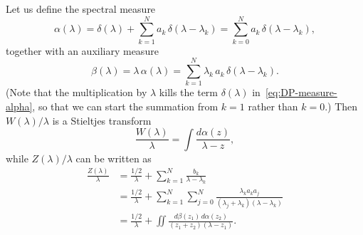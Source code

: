 \documentclass[10pt,a4paper]{article} \pdfoutput=1 
\begin{document}
Let us define the spectral measure
\begin{equation}
  \label{eq:DP-measure-alpha}
  \alpha(\lambda)
  = \delta(\lambda) + \sum_{k=1}^N a_k \, \delta(\lambda-\lambda_k)
  = \sum_{k=0}^N a_k \, \delta(\lambda-\lambda_k)
  ,
\end{equation}
together with an auxiliary measure
\begin{equation}
  \label{eq:DP-measure-beta}
  \beta(\lambda)
  = \lambda \, \alpha(\lambda)
  = \sum_{k=1}^N \lambda_k \, a_k \, \delta(\lambda-\lambda_k)
  .
\end{equation}
(Note that the multiplication by $\lambda$ kills the term $\delta(\lambda)$
in~\eqref{eq:DP-measure-alpha}, so that we can start the summation from $k=1$ rather than $k=0$.)
Then $W(\lambda)/\lambda$ is a Stieltjes transform
\begin{equation}
  \label{eq:DP-W-stieltjes-transform}
  \frac{W(\lambda)}{\lambda}
  = \int \frac{d\alpha(z)}{\lambda-z}
  ,
\end{equation}
while $Z(\lambda)/\lambda$ can be written as
\begin{equation}
  \label{eq:DP-Z-stieltjes-transform}
  \begin{split}
    \frac{Z(\lambda)}{\lambda}
    &
    = \frac{1/2}{\lambda} + \sum_{k=1}^N \frac{b_k}{\lambda - \lambda_k}
    \\ &
    = \frac{1/2}{\lambda} + \sum_{k=1}^N \sum_{j=0}^N \frac{\lambda_k a_k a_j}{(\lambda_j + \lambda_k) (\lambda - \lambda_k)}
    \\ &
    = \frac{1/2}{\lambda} + \iint \frac{d\beta(z_1) \, d\alpha(z_2)}{(z_1+z_2)(\lambda-z_1)}
    .
  \end{split}
\end{equation}
\end{document}
